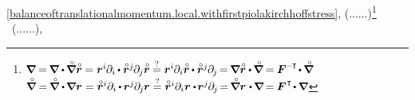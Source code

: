 \eqref{balanceoftranslationalmomentum.local.withfirstpiolakirchhoffstress}, (......)\footnote{%
${\boldnabla \hspace{-0.08ex}
= \hspace{-0.2ex} \boldnabla \dotp \hspace{-0.15ex} \boldnablacircled \initiallocationvector \hspace{-0.08ex}
= \currentlocationvector^{i} \hspace{-0.1ex} \partial_{i} \hspace{-0.15ex} \dotp \initiallocationvector^j \hspace{-0.1ex} \partial_{\hspace{-0.1ex}j} \initiallocationvector \hspace{-0.1ex}
\stackrel{?}{=} \currentlocationvector^{i} \hspace{-0.1ex} \partial_{i} \initiallocationvector \hspace{-0.1ex} \dotp \initiallocationvector^j \hspace{-0.1ex} \partial_{\hspace{-0.1ex}j} \hspace{-0.3ex}
= \hspace{-0.2ex} \boldnabla \initiallocationvector \dotp \hspace{-0.15ex} \boldnablacircled \hspace{-0.1ex}
= \hspace{-0.1ex} \bm{F}^{\hspace{.1ex}\expminusT} \hspace{-0.3ex} \dotp \hspace{-0.1ex} \boldnablacircled}$ \\
%
${\boldnablacircled \hspace{-0.1ex}
= \hspace{-0.2ex} \boldnablacircled \dotp \hspace{-0.2ex} \boldnabla \currentlocationvector
= \initiallocationvector^{i} \partial_{i} \hspace{-0.15ex} \dotp \hspace{-0.1ex} \currentlocationvector^{j} \hspace{-0.1ex} \partial_{\hspace{-0.1ex}j} \hspace{-0.1ex} \currentlocationvector
\stackrel{?}{=} \initiallocationvector^{i} \partial_{i} \currentlocationvector \dotp \hspace{-0.25ex} \currentlocationvector^{j} \hspace{-0.1ex} \partial_{\hspace{-0.1ex}j} \hspace{-0.3ex}
= \hspace{-0.3ex} \boldnablacircled \currentlocationvector \hspace{.1ex} \dotp \hspace{-0.15ex} \boldnabla \hspace{-0.25ex}
= \hspace{-0.1ex} \bm{F}^{\hspace{.1ex}\T} \hspace{-0.3ex} \dotp \hspace{-0.1ex} \boldnabla}$}
~(......),

